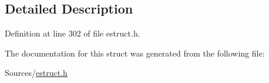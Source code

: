 \subsection{Detailed Description}


Definition at line 302 of file estruct.\-h.



The documentation for this struct was generated from the following file\-:\begin{DoxyCompactItemize}
\item 
Sources/\hyperlink{estruct_8h}{estruct.\-h}\end{DoxyCompactItemize}
